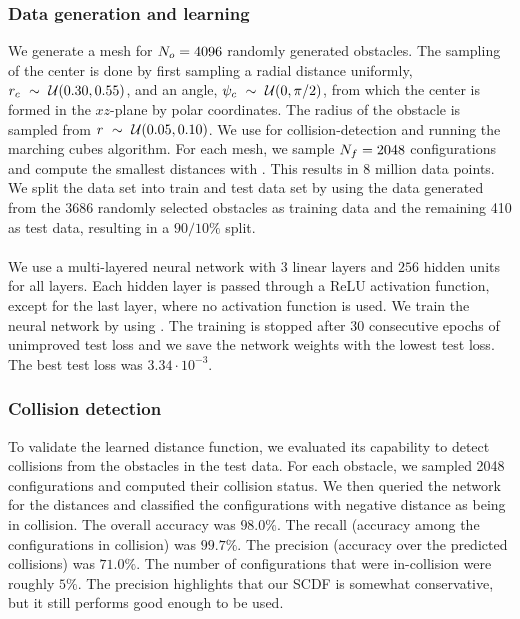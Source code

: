 \documentclass[../main.tex]{subfiles}
\begin{document}
\subsubsection{Data generation and learning}
We generate a mesh for $N_{o}=4096$ randomly generated obstacles. The sampling of the center is done by first sampling a radial distance uniformly, $r_{c}~\sim~\mathcal{U}(0.30, 0.55)$, and an angle, $\psi_{c}~\sim~\mathcal{U}(0, \pi/2)$, from which the center is formed in the $xz$-plane by polar coordinates. The radius of the obstacle is sampled from $r~\sim~\mathcal{U}(0.05, 0.10)$. We use \cite{trimesh} for collision-detection and running the marching cubes algorithm. For each mesh, we sample $N_{f}=2048$ configurations and compute the smallest distances with \cite{pcu}. This results in 8 million data points. We split the data set into train and test data set by using the data generated from the 3686 randomly selected obstacles as training data and the remaining 410 as test data, resulting in a $90/10\%$ split.
\\\\
We use a multi-layered neural network with $3$ linear layers and $256$ hidden units for all layers. Each hidden layer is passed through a ReLU activation function, except for the last layer, where no activation function is used. We train the neural network by using \cite{pytorch}. The training is stopped after 30 consecutive epochs of unimproved test loss and we save the network weights with the lowest test loss. The best test loss was $3.34 \cdot 10^{-3}$.
\subsubsection{Collision detection}
To validate the learned distance function, we evaluated its capability to detect collisions from the obstacles in the test data. For each obstacle, we sampled 2048 configurations and computed their collision status. We then queried the network for the distances and classified the configurations with negative distance as being in collision. The overall accuracy was $98.0\%$. The recall (accuracy among the configurations in collision) was $99.7\%$. The precision (accuracy over the predicted collisions) was $71.0\%$. The number of configurations that were in-collision were roughly $5 \%$. The precision highlights that our SCDF is somewhat conservative, but it still performs good enough to be used.
\end{document}
